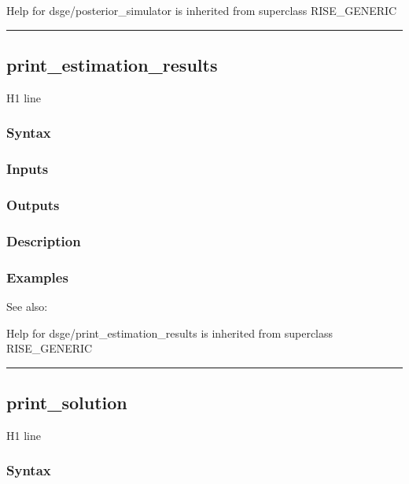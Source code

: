 \documentclass[letterpaper,10pt,english]{sphinxmanual}
\begin{document}
Help for dsge/posterior\_simulator is inherited from superclass RISE\_GENERIC


\bigskip\hrule{}\bigskip



\subsection{print\_estimation\_results}
\label{classes/models/@dsge/dsge:print-estimation-results}\label{classes/models/@dsge/dsge:id122}
H1 line


\subsubsection{Syntax}
\label{classes/models/@dsge/dsge:id123}

\subsubsection{Inputs}
\label{classes/models/@dsge/dsge:id124}

\subsubsection{Outputs}
\label{classes/models/@dsge/dsge:id125}

\subsubsection{Description}
\label{classes/models/@dsge/dsge:id126}

\subsubsection{Examples}
\label{classes/models/@dsge/dsge:id127}
See also:

Help for dsge/print\_estimation\_results is inherited from superclass RISE\_GENERIC


\bigskip\hrule{}\bigskip



\subsection{print\_solution}
\label{classes/models/@dsge/dsge:print-solution}\label{classes/models/@dsge/dsge:id128}
H1 line


\subsubsection{Syntax}
\label{classes/models/@dsge/dsge:id129}
\end{document}

